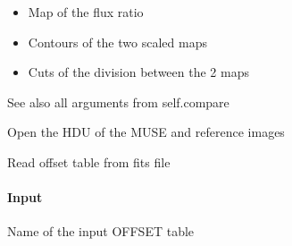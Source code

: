 \documentclass[letterpaper,10pt,english]{sphinxmanual}
\begin{document}
\begin{fulllineitems}
\begin{fulllineitems}
\begin{description}
\begin{description}
\begin{itemize}
\item {} 
\sphinxAtStartPar
Map of the flux ratio

\item {} 
\sphinxAtStartPar
Contours of the two scaled maps

\item {} 
\sphinxAtStartPar
Cuts of the division between the 2 maps

\end{itemize}

\end{description}

\end{description}

\sphinxAtStartPar
See also all arguments from self.compare

\end{fulllineitems}


\begin{fulllineitems}
\label{\detokenize{api/pymusepipe:pymusepipe.align_pipe.AlignMuseDataset.open_hdu}}
\pysigstartsignatures
{}
\pysigstopsignatures
\sphinxAtStartPar
Open the HDU of the MUSE and reference images

\end{fulllineitems}


\begin{fulllineitems}
\label{\detokenize{api/pymusepipe:pymusepipe.align_pipe.AlignMuseDataset.open_offset_table}}
\pysigstartsignatures
{}
\pysigstopsignatures
\sphinxAtStartPar
Read offset table from fits file


\paragraph{Input}
\label{\detokenize{api/pymusepipe:id19}}\begin{description}
\sphinxAtStartPar
Name of the input OFFSET table


\end{description}
\end{fulllineitems}
\end{fulllineitems}
\end{document}
